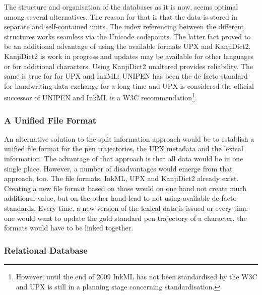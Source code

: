 The structure and organisation of the databases as it is now, seems optimal
among several alternatives. The reason for that is that the data is stored in
separate and self-contained units. The index referencing between the different
structures works seamless via the Unicode codepoints. The latter fact proved
to be an additional advantage of using the available formats UPX and
KanjiDict2. KanjiDict2 is work in progress and updates may be available 
for other languages or for additional characters. 
Using KanjiDict2 unaltered provides reliability.
The same is true for for UPX and InkML: UNIPEN has been the de facto standard
for handwriting data exchange for a long time and UPX is considered the
official successor of UNIPEN and InkML is a W3C recommendation\footnote{
However, until the end of 2009 InkML has not been standardised by the W3C and
UPX is still in a planning stage concerning standardisation.}.

\subsubsection{A Unified File Format}
\label{sec:hwre:aunifiedfileformat}

An alternative solution to the split information approach would be to
establish a unified file format for the pen trajectories, the UPX metadata
and the lexical information. 
The advantage of that approach is that all data would be in one single 
place. However, a number of disadvantages would emerge from that approach, too.
The file formats, InkML, UPX and KanjiDict2 already exist.
Creating a new file format based on those would on one hand not create much 
additional value, but on the other hand lead to not using available de facto
standards. Every time, a new version of the lexical data is issued or every
time one would want to update the gold standard pen trajectory of a character,
the formats would have to be linked together. 

\subsubsection{Relational Database}
\label{sec:hwre:relationaldatabase}

